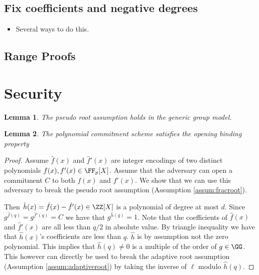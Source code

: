 \documentclass{article}
\newtheorem{lemma}{Lemma}
\begin{document}
\subsection{Fix coefficients and negative degrees}
\begin{itemize}
	\item Several ways to do this.
\end{itemize}

\subsection{Range Proofs}

\section{Security}

\begin{lemma}
	The pseudo root assumption holds in the generic group model.
\end{lemma}
\begin{lemma}
	The polynomial commitment scheme satisfies the opening binding property
\end{lemma}
\begin{proof}
	Assume $\hat{f}(x)$ and $\hat{f}'(x)$ are integer encodings of two distinct polynomials $f(x),f'(x) \in \FF_p[X]$. Assume that the adversary can open a commitment $C$ to both $f(x)$ and $f'(x)$. We show that we can use this adversary to break the pseudo root assumption (Assumption \ref{assum:fracroot}).
	
	 Then $\hat{h}(x)=\hat{f}(x)-\hat{f}'(x) \in \ZZ[X]$ is a polynomial of degree at most $d$. Since $g^{\hat{f}(q)}=g^{\hat{f}'(q)}=C$ we have that $g^{\hat{h}(q)}=1$. Note that the coefficients of $\hat{f}(x)$ and $\hat{f}'(x)$ are all less than $q/2$ in absolute value. By triangle inequality we have that $\hat{h}(x)$'s coefficients are less than $q$. $\hat{h}$ is by assumption not the zero polynomial. This implies that $\hat{h}(q)\neq 0$ is a multiple of the order of $g\in \GG$. This however can directly be used to break the adaptive root assumption (Assumption \ref{assum:adaptiveroot}) by taking the inverse of $\ell$ modulo $\hat{h}(q)$.
\end{proof}
\end{document}

